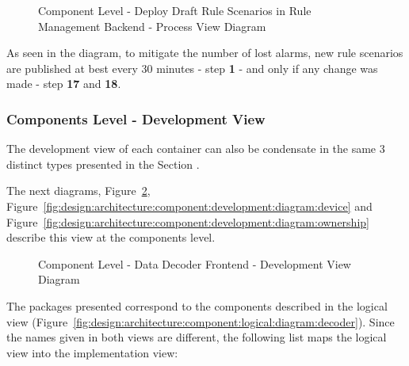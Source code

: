 \begin{figure}[H]
   \centering
   \resizebox{\columnwidth}{!}
   {
      
   }
   \caption[Component Level - Deploy Draft Rule Scenarios in Rule Management Backend - Process View Diagram]{Component Level - Deploy Draft Rule Scenarios in Rule Management Backend - Process View Diagram}
   \label{fig:design:architecture:component:process:diagram:rule}
\end{figure}

As seen in the diagram, to mitigate the number of lost alarms, new rule scenarios are published at best every 30 minutes - step \textbf{1} - and only if any change was made - step \textbf{17} and \textbf{18}.  

\subsubsection*{Components Level - Development View}
\label{subsubsec:design:architecture:components:development}

The development view of each container can also be condensate in the same 3 distinct types presented in the Section .

The next diagrams, Figure~\ref{fig:design:architecture:component:development:diagram:decoder}, Figure~\ref{fig:design:architecture:component:development:diagram:device} and Figure~\ref{fig:design:architecture:component:development:diagram:ownership} describe this view at the components level.

\begin{figure}[H]
   \centering
   \resizebox{\columnwidth}{!}
   {
      
   }
   \caption[Component Level - Data Decoder Frontend - Development View Diagram]{Component Level - Data Decoder Frontend - Development View Diagram}
   \label{fig:design:architecture:component:development:diagram:decoder}
\end{figure}

The packages presented correspond to the components described in the logical view (Figure~\ref{fig:design:architecture:component:logical:diagram:decoder}). Since the names given in both views are different, the following list maps the logical view into the implementation view:

